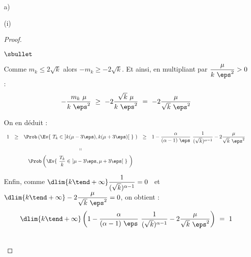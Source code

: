 \documentclass[11pt]{article}%
\begin{document}
\begin{liste}{a)}
\begin{nonoliste}{(i)}
\begin{proof}
\begin{noliste}{$\sbullet$}
      \item Comme $m_k \leq 2 \sqrt{k}$ alors $-m_k \geq - 2
        \sqrt{k}$. Et ainsi, en multipliant par $\dfrac{\mu}{k \
          \eps^2} > 0$ :
        \[
        -\dfrac{m_k \ \mu}{k \ \eps^2} \ \geq \ - 2 \dfrac{\sqrt{k} \
          \mu}{k \ \eps^2} \ = \ -2 \dfrac{\mu}{\sqrt{k} \ \eps^2}
        \]

      \item On en déduit : 
        \[
        \begin{array}{ccccc}
          1 & \geq & \Prob\left(\Ev{\ T_{k} \in \ ]k(\mu - 3 \eps), k(\mu + 3
              \eps)[ \ } \ \right) & \geq & 1 - \dfrac{\alpha}{(\alpha -
            1) \ \eps} \ \dfrac{1}{(\sqrt{k})^{\alpha - 1}} - 2
          \dfrac{\mu}{\sqrt{k} \ \eps^2}
          \\[.4cm]
          & & \shortparallel 
          \\[.2cm]
          & & \Prob\left(\Ev{\ \dfrac{T_{k}}{k} \in \ ]\mu - 3 \eps, \mu + 3
              \eps[ \ } \ \right)
        \end{array}
        \]

      \item Enfin, comme $\dlim{k \tend +\infty}
        \dfrac{1}{(\sqrt{k})^{\alpha - 1}} = 0$ \ et \ $\dlim{k \tend
          +\infty} - 2 \dfrac{\mu}{\sqrt{k} \ \eps^2} = 0$, on obtient
        :
        \[
        \dlim{k \tend +\infty} \left(1 - \dfrac{\alpha}{(\alpha - 1) \
            \eps} \ \dfrac{1}{(\sqrt{k})^{\alpha - 1}} - 2
          \dfrac{\mu}{\sqrt{k} \ \eps^2} \right) \ = \ 1
        \]
      \end{noliste}
      \conc{On en conclut, par théorème d'encadrement : $\dlim{k \tend
          +\infty} \Prob\left(\Ev{\ \dfrac{T_{k}}{k} \in \ ]\mu - 3
            \eps, \mu + 3 \eps[ \ } \ \right) \ = \ 1$}~\\[-.8cm]
    \end{proof}
  \end{nonoliste}
\end{liste}
\end{document}
